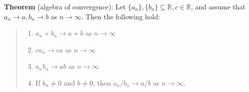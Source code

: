 \documentclass[11pt]{article}
\begin{document}
\textbf{Theorem} (algebra of convergence): Let $\{a_n\}, \{b_n\} \subseteq \mathbb{R}, c \in \mathbb{R}$, and assume that $a_n \to a, b_n \to b$ as $n \to \infty$. Then the following hold:
\begin{quote}\vspace{-0.3cm}
	\begin{enumerate}
	\item $a_n + b_n \to a + b$ as $n \to \infty$
	\item $ca_n \to ca$ as $n \to \infty$
	\item $a_nb_n \to ab$ as $n \to \infty$
	\item If $b_n \neq 0$ and $b \neq 0$, then $a_n/b_n \to a/b$ as $n \to \infty$.
	\end{enumerate}
\end{quote}
\end{document}

